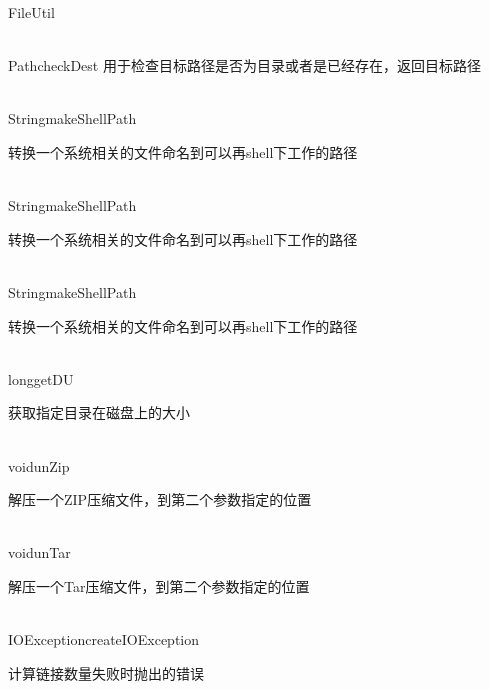 \begin{XeClass}{FileUtil}
\begin{XeMethod}{\XePrivate\\ }{Path}{checkDest}
 用于检查目标路径是否为目录或者是已经存在，返回目标路径

  \end{XeMethod}

  \begin{XeMethod}{\XePublic\\ }{String}{makeShellPath}
       
 转换一个系统相关的文件命名到可以再shell下工作的路径

  \end{XeMethod}

  \begin{XeMethod}{\XePublic\\ }{String}{makeShellPath}
       
 转换一个系统相关的文件命名到可以再shell下工作的路径

  \end{XeMethod}

  \begin{XeMethod}{\XePublic\\ }{String}{makeShellPath}
       
 转换一个系统相关的文件命名到可以再shell下工作的路径

  \end{XeMethod}

  \begin{XeMethod}{\XePublic\\ }{long}{getDU}
       
 获取指定目录在磁盘上的大小

  \end{XeMethod}

  \begin{XeMethod}{\XePublic\\ }{void}{unZip}
       
 解压一个ZIP压缩文件，到第二个参数指定的位置

  \end{XeMethod}

  \begin{XeMethod}{\XePublic\\ }{void}{unTar}
       
 解压一个Tar压缩文件，到第二个参数指定的位置

  \end{XeMethod}

  \begin{XeMethod}{\XePrivate\\ }{IOException}{createIOException}
       
 计算链接数量失败时抛出的错误


\end{XeMethod}
\end{XeClass}
